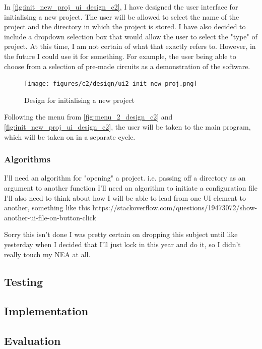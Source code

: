 \documentclass[11pt]{article}
\begin{document}
                In \autoref{fig:init_new_proj_ui_design_c2}, I have designed the user interface for initialising a new project. The user will be allowed to select the name of the project and the directory in which the project is stored. I have also decided to include a dropdown selection box that would allow the user to select the "type" of project. At this time, I am not certain of what that exactly refers to. However, in the future I could use it for something. For example, the user being able to choose from a selection of pre-made circuits as a demonstration of the software.

                \begin{figure}[!ht]
                    \centering
                    \texttt{[image: figures/c2/design/ui2\_init\_new\_proj.png]}
                    \caption{Design for initialising a new project}
                    \label{fig:init_new_proj_ui_design_c2}
                \end{figure}

                Following the menu from \autoref{fig:menu_2_design_c2} and \autoref{fig:init_new_proj_ui_design_c2}, the user will be taken to the main program, which will be taken on in a separate cycle.


            \subsubsection{Algorithms}
                I'll need an algorithm for "opening" a project. i.e. passing off a directory as an argument to another function
                I'll need an algorithm to initiate a configuration file
                I'll also need to think about how I will be able to lead from one UI element to another, something like this https://stackoverflow.com/questions/19473072/show-another-ui-file-on-button-click


                Sorry this isn't done I was pretty certain on dropping this subject until like yesterday when I decided that I'll just lock in this year and do it, so I didn't really touch my NEA at all.
                
            
        \subsection{Testing}
        \subsection{Implementation}
        \subsection{Evaluation}
\end{document}
